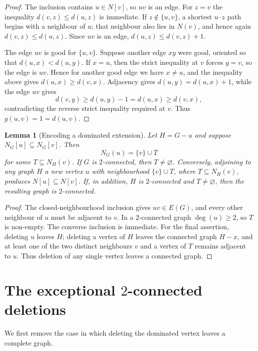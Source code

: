 \documentclass[11pt,reqno]{amsart}
\newtheorem{lemma}[lemma]{Lemma}
\theoremstyle{definition}
\theoremstyle{remark}
\begin{document}
\begin{proof}
The inclusion contains $u\in N[v]$, so $uv$ is an edge.  For $z=v$ the inequality $d(v,z)\le d(u,z)$ is immediate.  If
$z\notin\{u,v\}$, a shortest $u$--$z$ path begins with a neighbour of $u$;
that neighbour also lies in $N(v)$, and hence again $d(v,z)\le d(u,z)$.
Since $uv$ is an edge,
$d(u,z)\le d(v,z)+1$.

The edge $uv$ is good for $\{u,v\}$.  Suppose another edge $xy$ were good,
oriented so that $d(u,x)<d(u,y)$.  If $x=u$, then the strict inequality at
$v$ forces $y=v$, so the edge is $uv$.  Hence for another good edge we have
$x\ne u$, and the inequality above gives $d(u,x)\ge d(v,x)$.  Adjacency
gives $d(u,y)=d(u,x)+1$, while the edge $uv$ gives
\[
 d(v,y)\ge d(u,y)-1=d(u,x)\ge d(v,x),
\]
contradicting the reverse strict inequality required at $v$.  Thus
$g(u,v)=1=d(u,v)$.
\end{proof}

\begin{lemma}[Encoding a dominated extension]\label{lem:encoding}
Let $H=G-u$ and suppose $N_G[u]\subseteq N_G[v]$.  Then
\[
  N_G(u)=\{v\}\cup T
\]
for some $T\subseteq N_H(v)$.  If $G$ is $2$-connected, then $T\ne\varnothing$.
Conversely, adjoining to any graph $H$ a new vertex $u$ with neighbourhood
$\{v\}\cup T$, where $T\subseteq N_H(v)$, produces $N[u]\subseteq N[v]$.
If, in addition, $H$ is $2$-connected and $T\ne\varnothing$, then the resulting
graph is $2$-connected.
\end{lemma}

\begin{proof}
The closed-neighbourhood inclusion gives $uv\in E(G)$, and every other
neighbour of $u$ must be adjacent to $v$.  In a $2$-connected graph
$\deg(u)\ge2$, so $T$ is non-empty.  The converse inclusion is immediate.
For the final assertion, deleting $u$ leaves $H$; deleting a vertex of $H$
leaves the connected graph $H-x$, and at least one of the two distinct
neighbours $v$ and a vertex of $T$ remains adjacent to $u$.  Thus deletion of
any single vertex leaves a connected graph.
\end{proof}

\section{The exceptional \texorpdfstring{$2$}{2}-connected deletions}\label{sec:exceptional}

We first remove the case in which deleting the dominated vertex leaves a
complete graph.
\end{document}
